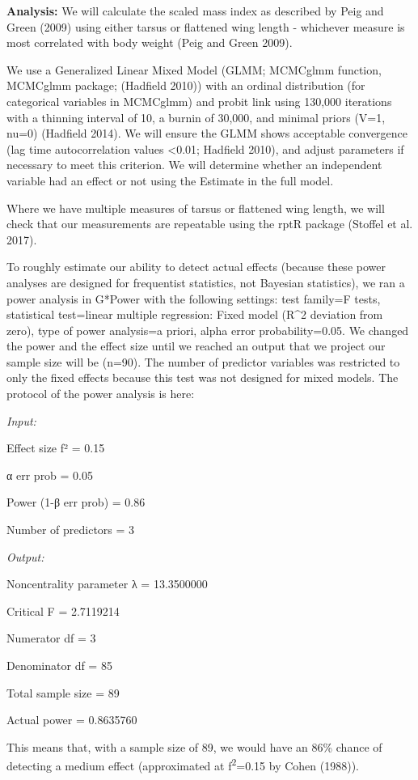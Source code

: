 \documentclass[
]{article}
\begin{document}
\textbf{Analysis:} We will calculate the scaled mass index as described
by Peig and Green (2009) using either tarsus or flattened wing length -
whichever measure is most correlated with body weight (Peig and Green
2009).

We use a Generalized Linear Mixed Model (GLMM; MCMCglmm function,
MCMCglmm package; (Hadfield 2010)) with an ordinal distribution (for
categorical variables in MCMCglmm) and probit link using 130,000
iterations with a thinning interval of 10, a burnin of 30,000, and
minimal priors (V=1, nu=0) (Hadfield 2014). We will ensure the GLMM
shows acceptable convergence (lag time autocorrelation values
\textless0.01; Hadfield 2010), and adjust parameters if necessary to
meet this criterion. We will determine whether an independent variable
had an effect or not using the Estimate in the full model.

Where we have multiple measures of tarsus or flattened wing length, we
will check that our measurements are repeatable using the rptR package
(Stoffel et al. 2017).

To roughly estimate our ability to detect actual effects (because these
power analyses are designed for frequentist statistics, not Bayesian
statistics), we ran a power analysis in G*Power with the following
settings: test family=F tests, statistical test=linear multiple
regression: Fixed model (R\^{}2 deviation from zero), type of power
analysis=a priori, alpha error probability=0.05. We changed the power
and the effect size until we reached an output that we project our
sample size will be (n=90). The number of predictor variables was
restricted to only the fixed effects because this test was not designed
for mixed models. The protocol of the power analysis is here:

\emph{Input:}

Effect size f² = 0.15

α err prob = 0.05

Power (1-β err prob) = 0.86

Number of predictors = 3

\emph{Output:}

Noncentrality parameter λ = 13.3500000

Critical F = 2.7119214

Numerator df = 3

Denominator df = 85

Total sample size = 89

Actual power = 0.8635760

This means that, with a sample size of 89, we would have an 86\% chance
of detecting a medium effect (approximated at f\textsuperscript{2}=0.15
by Cohen (1988)).
\end{document}
